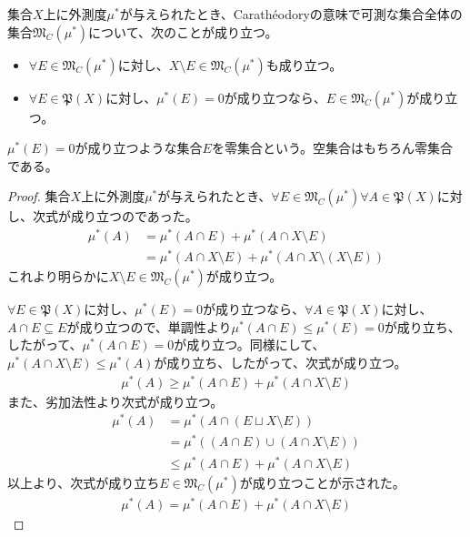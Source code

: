 \documentclass[dvipdfmx]{jsarticle}
\begin{document}
\begin{thm}\label{4.5.3.4}
集合$X$上に外測度$\mu^{*}$が与えられたとき、Carathéodoryの意味で可測な集合全体の集合$\mathfrak{M}_{C}\left( \mu^{*} \right)$について、次のことが成り立つ。
\begin{itemize}
\item
  $\forall E \in \mathfrak{M}_{C}\left( \mu^{*} \right)$に対し、$X \setminus E \in \mathfrak{M}_{C}\left( \mu^{*} \right)$も成り立つ。
\item
  $\forall E \in \mathfrak{P}(X)$に対し、$\mu^{*}(E) = 0$が成り立つなら、$E \in \mathfrak{M}_{C}\left( \mu^{*} \right)$が成り立つ。
\end{itemize}
$\mu^{*}(E) = 0$が成り立つような集合$E$を零集合という。空集合はもちろん零集合である。
\end{thm}
\begin{proof}
集合$X$上に外測度$\mu^{*}$が与えられたとき、$\forall E \in \mathfrak{M}_{C}\left( \mu^{*} \right)\forall A \in \mathfrak{P}(X)$に対し、次式が成り立つのであった。
\begin{align*}
\mu^{*}(A) &= \mu^{*}(A \cap E) + \mu^{*}(A \cap X \setminus E)\\
&= \mu^{*}(A \cap X \setminus E) + \mu^{*}\left( A \cap X \setminus (X \setminus E) \right)
\end{align*}
これより明らかに$X \setminus E \in \mathfrak{M}_{C}\left( \mu^{*} \right)$が成り立つ。\par
$\forall E \in \mathfrak{P}(X)$に対し、$\mu^{*}(E) = 0$が成り立つなら、$\forall A \in \mathfrak{P}(X)$に対し、$A \cap E \subseteq E$が成り立つので、単調性より$\mu^{*}(A \cap E) \leq \mu^{*}(E) = 0$が成り立ち、したがって、$\mu^{*}(A \cap E) = 0$が成り立つ。同様にして、$\mu^{*}(A \cap X \setminus E) \leq \mu^{*}(A)$が成り立ち、したがって、次式が成り立つ。
\begin{align*}
\mu^{*}(A) \geq \mu^{*}(A \cap E) + \mu^{*}(A \cap X \setminus E)
\end{align*}
また、劣加法性より次式が成り立つ。
\begin{align*}
\mu^{*}(A) &= \mu^{*}\left( A \cap (E \sqcup X \setminus E) \right)\\
&= \mu^{*}\left( (A \cap E) \cup (A \cap X \setminus E) \right)\\
&\leq \mu^{*}(A \cap E) + \mu^{*}(A \cap X \setminus E)
\end{align*}
以上より、次式が成り立ち$E \in \mathfrak{M}_{C}\left( \mu^{*} \right)$が成り立つことが示された。
\begin{align*}
\mu^{*}(A) = \mu^{*}(A \cap E) + \mu^{*}(A \cap X \setminus E)
\end{align*}
\end{proof}
\end{document}
